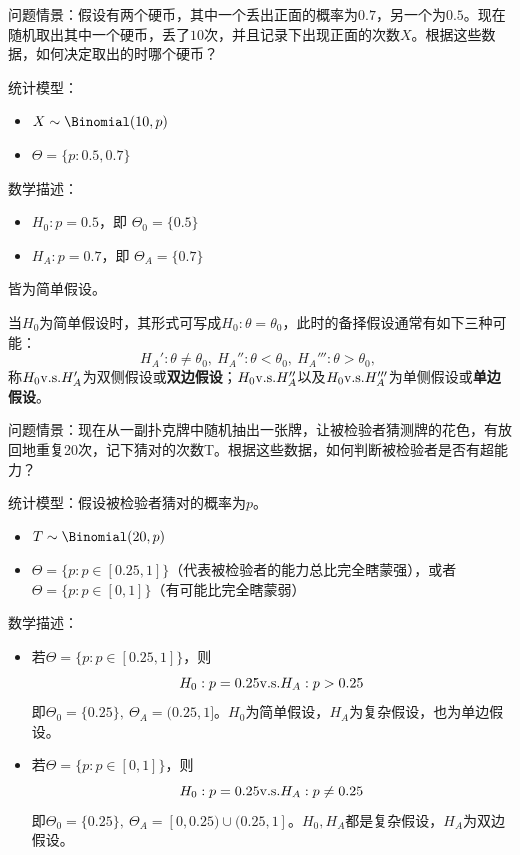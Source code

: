 \begin{example}[硬币辨别实验]\label{ex:coins}
    问题情景：假设有两个硬币，其中一个丢出正面的概率为$0.7$，另一个为$0.5$。现在随机取出其中一个硬币，丢了$10$次，并且记录下出现正面的次数$X$。根据这些数据，如何决定取出的时哪个硬币？

    统计模型：
    \begin{itemize}
        \item $X \sim \Binomial(10,p)$
        \item $\Theta = \{p: 0.5, 0.7 \}$
    \end{itemize}

    数学描述：
    \begin{itemize}
        \item $H_0: p=0.5$，即 $\Theta_0=\{ 0.5 \}$
        \item $H_A: p=0.7$，即 $\Theta_A=\{ 0.7 \}$
    \end{itemize}
    皆为简单假设。
\end{example}

当$H_0$为简单假设时，其形式可写成$H_0:\theta = \theta_0$，此时的备择假设通常有如下三种可能：
\[ H_A':\theta \neq \theta_0,\ H_A'':\theta < \theta_0,\ H_A''':\theta > \theta_0,\ \]
称$H_0 \text{v.s.} H_A'$为双侧假设或\textbf{双边假设}；$H_0 \text{v.s.} H_A''$以及$H_0 \text{v.s.} H_A'''$为单侧假设或\textbf{单边假设}。

\begin{example}[超能力检验]
    问题情景：现在从一副扑克牌中随机抽出一张牌，让被检验者猜测牌的花色，有放回地重复20次，记下猜对的次数T。根据这些数据，如何判断被检验者是否有超能力？

    统计模型：假设被检验者猜对的概率为$p$。
    \begin{itemize}
        \item $T \sim \Binomial(20,p)$
        \item $\Theta = \{p: p \in [0.25,1]\}$（代表被检验者的能力总比完全瞎蒙强），或者$\Theta = \{p: p \in [0,1]\}$（有可能比完全瞎蒙弱）
    \end{itemize}

    数学描述：
    \begin{itemize}
        \item 若$\Theta = \{p: p \in [0.25,1]\}$，则
              \[ H_0: p=0.25 \text{v.s.} H_A: p > 0.25  \]
              即$\Theta_0=\{ 0.25 \},\ \Theta_A=(0.25,1]$。$H_0$为简单假设，$H_A$为复杂假设，也为单边假设。
        \item 若$\Theta = \{p: p \in [0,1]\}$，则
              \[ H_0: p=0.25 \text{v.s.} H_A: p \neq 0.25  \]
              即$\Theta_0=\{ 0.25 \},\ \Theta_A=[0,0.25)\cup (0.25,1]$。$H_0,H_A$都是复杂假设，$H_A$为双边假设。
    \end{itemize}
\end{example}


